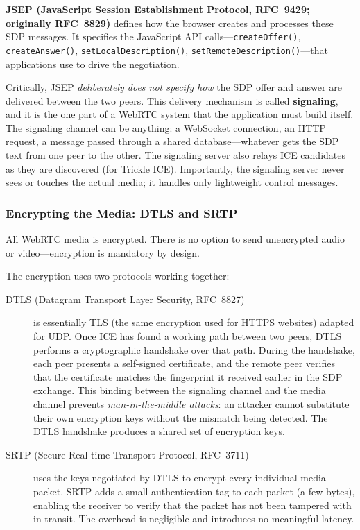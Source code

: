 \documentclass[11pt]{article}
\begin{document}
\textbf{JSEP (JavaScript Session Establishment Protocol, RFC~9429;
originally RFC~8829)} defines how the browser creates and processes these
SDP messages.  It specifies the JavaScript API calls---\texttt{createOffer()},
\texttt{createAnswer()}, \texttt{setLocalDescription()},
\texttt{setRemoteDescription()}---that applications use to drive the
negotiation.

Critically, JSEP \emph{deliberately does not specify how} the SDP offer and
answer are delivered between the two peers.  This delivery mechanism is
called \textbf{signaling}, and it is the one part of a WebRTC system that
the application must build itself.  The signaling channel can be anything:
a WebSocket connection, an HTTP request, a message passed through a shared
database---whatever gets the SDP text from one peer to the other.  The
signaling server also relays ICE candidates as they are discovered (for
Trickle ICE).  Importantly, the signaling server never sees or touches the
actual media; it handles only lightweight control messages.

\subsubsection{Encrypting the Media: DTLS and SRTP}

All WebRTC media is encrypted.  There is no option to send unencrypted
audio or video---encryption is mandatory by design.

The encryption uses two protocols working together:

\begin{description}
  \item[DTLS (Datagram Transport Layer Security, RFC~8827)] is essentially
    TLS (the same encryption used for HTTPS websites) adapted for UDP.  Once
    ICE has found a working path between two peers, DTLS performs a
    cryptographic handshake over that path.  During the handshake, each peer
    presents a self-signed certificate, and the remote peer verifies that the
    certificate matches the fingerprint it received earlier in the SDP
    exchange.  This binding between the signaling channel and the media
    channel prevents \emph{man-in-the-middle attacks}: an attacker cannot
    substitute their own encryption keys without the mismatch being detected.
    The DTLS handshake produces a shared set of encryption keys.

  \item[SRTP (Secure Real-time Transport Protocol, RFC~3711)] uses the keys
    negotiated by DTLS to encrypt every individual media packet.  SRTP adds
    a small authentication tag to each packet (a few bytes), enabling the
    receiver to verify that the packet has not been tampered with in transit.
    The overhead is negligible and introduces no meaningful latency.
\end{description}
\end{document}
